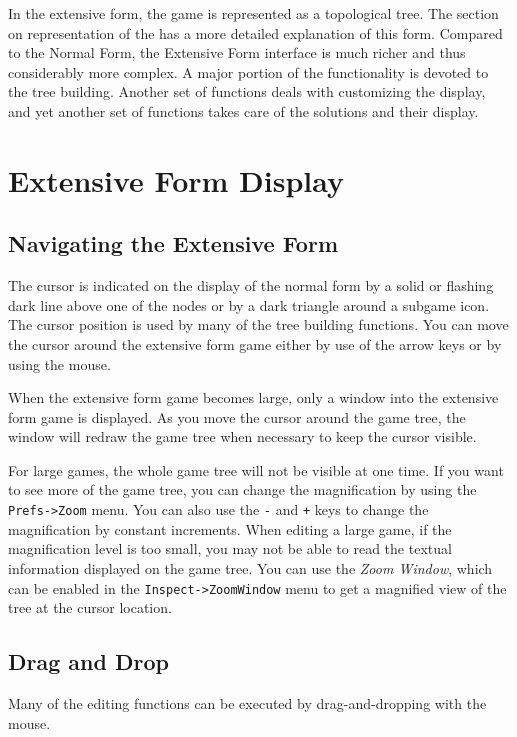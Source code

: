 In the extensive form, the game is represented as a topological tree.  The 
section on representation of the  
has a more detailed explanation of this form.
Compared to the Normal Form, the Extensive Form interface is much richer
and thus considerably more complex.  A major portion of the functionality
is devoted to the tree building.  Another set of functions deals with
customizing the display, and yet another set of functions takes care of
the solutions and their display.  

\section{Extensive Form Display}

\subsection{Navigating the Extensive Form}
The cursor is indicated on the display of the normal form by a 
solid or flashing dark line above 
one of the nodes or by a dark triangle around a subgame icon. 
The cursor position is used by many of the tree building functions.  
You can move the cursor around the extensive form game 
either by use of the arrow keys or by using the mouse.  

When the extensive form 
game becomes large, only a window into the extensive form game is displayed.  
As you move the cursor around the game tree, the window will redraw 
the game tree when necessary to keep the cursor visible. 

For large games, the whole game tree will not be visible at one time.  If you 
want to see more of the game tree, you can change the magnification by 
using the {\tt Prefs->Zoom} menu.  You can also use the \verb+-+ and 
\verb&+& keys to change the magnification by constant increments. When 
editing a large game, if the magnification level is too small, you may 
not be able to read the textual information displayed on the game tree.  You 
can use the {\em Zoom Window}, which can be enabled in the 
{\tt Inspect->ZoomWindow} menu to get a magnified view of the tree 
at the cursor location.  

\subsection{Drag and Drop}\label{DragAndDrop}
Many of the editing functions can be executed by drag-and-dropping
with the mouse.  

